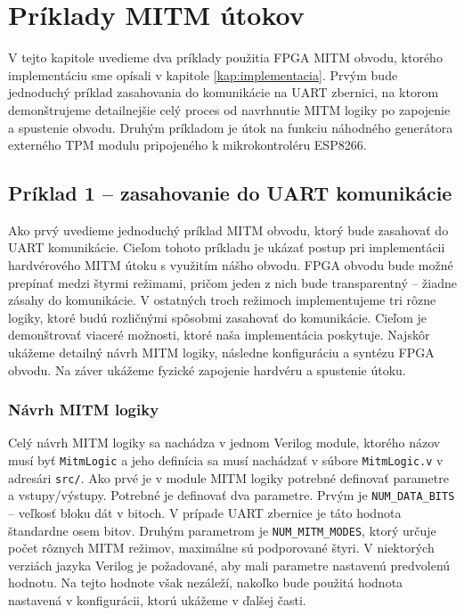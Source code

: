 \chapter{Príklady MITM útokov}
\label{kap:priklady}

V tejto kapitole uvedieme dva príklady použitia FPGA MITM obvodu, ktorého implementáciu sme opísali v kapitole \ref{kap:implementacia}. Prvým bude jednoduchý príklad zasahovania do komunikácie na UART zbernici, na ktorom demonštrujeme detailnejšie celý proces od navrhnutie MITM logiky po zapojenie a spustenie obvodu. Druhým príkladom je útok na funkciu náhodného generátora externého TPM modulu pripojeného k mikrokontroléru ESP8266.

\section{Príklad 1 -- zasahovanie do UART komunikácie}
Ako prvý uvedieme jednoduchý príklad MITM obvodu, ktorý bude zasahovať do UART komunikácie. Cieľom tohoto príkladu je ukázať postup pri implementácii hardvérového MITM útoku s využitím nášho obvodu. FPGA obvodu bude možné prepínať medzi štyrmi režimami, pričom jeden z nich bude transparentný -- žiadne zásahy do komunikácie. V ostatných troch režimoch implementujeme tri rôzne logiky, ktoré budú rozličnými spôsobmi zasahovať do komunikácie. Cieľom je demonštrovať viaceré možnosti, ktoré naša implementácia poskytuje. Najskôr ukážeme detailný návrh MITM logiky, následne konfiguráciu a syntézu FPGA obvodu. Na záver ukážeme fyzické zapojenie hardvéru a spustenie útoku.

\subsection{Návrh MITM logiky} \label{subsek:uartMitmLogic}
Celý návrh MITM logiky sa nachádza v jednom Verilog module, ktorého názov musí byť \texttt{MitmLogic} a jeho definícia sa musí nachádzať v súbore \texttt{MitmLogic.v} v adresári \texttt{src/}. Ako prvé je v module MITM logiky potrebné definovať parametre a vstupy/výstupy. Potrebné je definovať dva parametre. Prvým je \texttt{NUM\_DATA\_BITS} -- veľkosť bloku dát v bitoch. V prípade UART zbernice je táto hodnota štandardne osem bitov. Druhým parametrom je \texttt{NUM\_MITM\_MODES}, ktorý určuje počet rôznych MITM režimov, maximálne sú podporované štyri. V niektorých verziách jazyka Verilog je požadované, aby mali parametre nastavenú predvolenú hodnotu. Na tejto hodnote však nezáleží, nakoľko bude použitá hodnota nastavená v konfigurácii, ktorú ukážeme v ďalšej časti.

